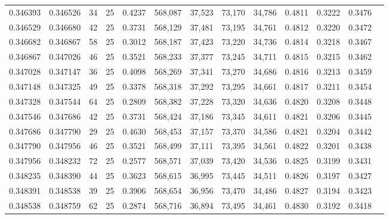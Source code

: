 \begin{tabular}{rrrrrrrrrrrrr}
0.346393 & 0.346526 &    34 &  25 &                                     0.4237 & 568,087 &  37,523 &  73,170 &  34,786 & 0.4811 & 0.3222 & 0.3476 \\
0.346529 & 0.346680 &    42 &  25 &                                     0.3731 & 568,129 &  37,481 &  73,195 &  34,761 & 0.4812 & 0.3220 & 0.3472 \\
0.346682 & 0.346867 &    58 &  25 &                                     0.3012 & 568,187 &  37,423 &  73,220 &  34,736 & 0.4814 & 0.3218 & 0.3467 \\
0.346867 & 0.347026 &    46 &  25 &                                     0.3521 & 568,233 &  37,377 &  73,245 &  34,711 & 0.4815 & 0.3215 & 0.3462 \\
0.347028 & 0.347147 &    36 &  25 &                                     0.4098 & 568,269 &  37,341 &  73,270 &  34,686 & 0.4816 & 0.3213 & 0.3459 \\
0.347148 & 0.347325 &    49 &  25 &                                     0.3378 & 568,318 &  37,292 &  73,295 &  34,661 & 0.4817 & 0.3211 & 0.3454 \\
0.347328 & 0.347544 &    64 &  25 &                                     0.2809 & 568,382 &  37,228 &  73,320 &  34,636 & 0.4820 & 0.3208 & 0.3448 \\
0.347546 & 0.347686 &    42 &  25 &                                     0.3731 & 568,424 &  37,186 &  73,345 &  34,611 & 0.4821 & 0.3206 & 0.3445 \\
0.347686 & 0.347790 &    29 &  25 &                                     0.4630 & 568,453 &  37,157 &  73,370 &  34,586 & 0.4821 & 0.3204 & 0.3442 \\
0.347790 & 0.347956 &    46 &  25 &                                     0.3521 & 568,499 &  37,111 &  73,395 &  34,561 & 0.4822 & 0.3201 & 0.3438 \\
0.347956 & 0.348232 &    72 &  25 &                                     0.2577 & 568,571 &  37,039 &  73,420 &  34,536 & 0.4825 & 0.3199 & 0.3431 \\
0.348235 & 0.348390 &    44 &  25 &                                     0.3623 & 568,615 &  36,995 &  73,445 &  34,511 & 0.4826 & 0.3197 & 0.3427 \\
0.348391 & 0.348538 &    39 &  25 &                                     0.3906 & 568,654 &  36,956 &  73,470 &  34,486 & 0.4827 & 0.3194 & 0.3423 \\
0.348538 & 0.348759 &    62 &  25 &                                     0.2874 & 568,716 &  36,894 &  73,495 &  34,461 & 0.4830 & 0.3192 & 0.3418 \\

\end{tabular}
